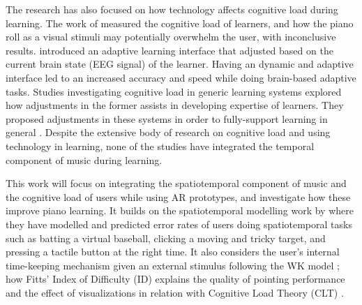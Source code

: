 \documentclass[manuscript,screen]{acmart}
\begin{document}
The research has also focused on how technology affects cognitive load during learning. The work of \citet{klepsch2017development} measured the cognitive load of learners, and how the piano roll as a visual stimuli may potentially overwhelm the user, with inconclusive results. \citet{yuksel2016learn} introduced an adaptive learning interface that adjusted based on the current brain state (EEG signal) of the learner. Having an dynamic and adaptive interface led to an increased accuracy and speed while doing brain-based adaptive tasks. Studies investigating cognitive load in generic learning systems explored how adjustments in the former assists in developing expertise of learners.  They proposed adjustments in these systems in order to fully-support learning in general \cite{rikers2004cognitive}. Despite the extensive body of research on cognitive load and using technology in learning, none of the studies have integrated the temporal component of music during learning.  

This work will focus on integrating the spatiotemporal component of music and the cognitive load of users while using AR prototypes, and investigate how these improve piano learning. It builds on the spatiotemporal modelling work by \citet{lee2016modelling, lee2017boxer, kim2018impact, liao2020button} where they have modelled and predicted error rates of users doing spatiotemporal tasks such as batting a virtual baseball, clicking a moving and tricky target, and pressing a tactile button at the right time. It also considers the user's internal time-keeping mechanism given an external stimulus following the WK model \cite{wing1973response, wing1973timing}; how Fitts' Index of Difficulty (ID) explains the quality of pointing performance \cite{mackenzie1992extending, park2020intermittent} and the effect of visualizations in relation with Cognitive Load Theory (CLT) \cite{klepsch2017development}.\\
\end{document}
